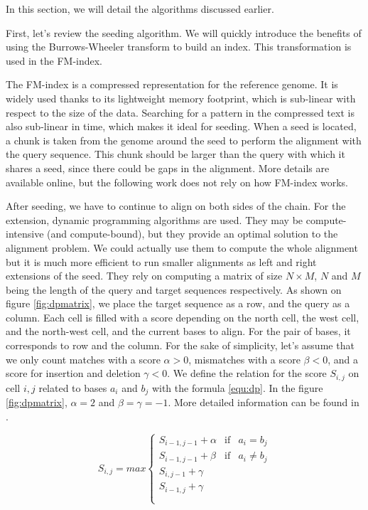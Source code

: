 In this section, we will detail the algorithms discussed earlier.

First, let's review the seeding algorithm. We will quickly introduce the benefits of using the Burrows-Wheeler transform to build an index. This transformation is used in the FM-index.

The FM-index is a compressed representation for the reference genome. It is widely used thanks to its lightweight memory footprint, which is sub-linear with respect to the size of the data. Searching for a pattern in the compressed text is also sub-linear in time, which makes it ideal for seeding. When a seed is located, a chunk is taken from the genome around the seed to perform the alignment with the query sequence. This chunk should be larger than the query with which it shares a seed, since there could be gaps in the alignment. More details are available online\cite{wiki:FMIndex}, but the following work does not rely on how FM-index works. 

After seeding, we have to continue to align on both sides of the chain. For the extension, dynamic programming algorithms are used. They may be compute-intensive (and compute-bound), but they provide an optimal solution to the alignment problem. We could actually use them to compute the whole alignment but it is much more efficient to run smaller alignments as left and right extensions of the seed. They rely on computing a matrix of size $N \times M$, $N$ and $M$ being the length of the query and target sequences respectively. As shown on figure \ref{fig:dpmatrix}, we place the target sequence as a row, and the query as a column. Each cell is filled with a score depending on the north cell, the west cell, and the north-west cell, and the current bases to align. For the pair of bases, it corresponds to row and the column. For the sake of simplicity, let's assume that we only count matches with a score $\alpha > 0$, mismatches with a score $\beta < 0$, and a score for insertion and deletion $\gamma < 0$. We define the relation for the score $S_{i,j}$ on cell $i,j$ related to bases $a_i$ and $b_j$ with the formula \ref{equ:dp}. In the figure \ref{fig:dpmatrix}, $\alpha = 2$ and $\beta = \gamma = -1$. More detailed information can be found in \cite{Aluru:2005:HCM:1121650}.

\begin{equation}
	S_{i,j} = max \left\{
	\begin{array}{llll}
		S_{i-1, j-1} + \alpha & \mbox{if} & a_i = b_j \\
		S_{i-1, j-1} + \beta & \mbox{if} & a_i \neq b_j \\
		S_{i, j-1} + \gamma \\
		S_{i-1, j} + \gamma\\
		 \\
	\end{array}
	\right.
	\label{equ:dp}
\end{equation}



